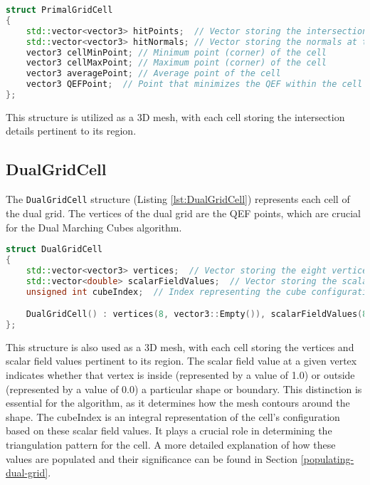 \vspace{2mm}
\begin{lstlisting}[language=C++, caption=PrimalGridCell structure, label=lst:PrimalGridCell]
struct PrimalGridCell 
{
    std::vector<vector3> hitPoints;  // Vector storing the intersection points within the cell
    std::vector<vector3> hitNormals; // Vector storing the normals at the intersection points within the cell
    vector3 cellMinPoint; // Minimum point (corner) of the cell
    vector3 cellMaxPoint; // Maximum point (corner) of the cell
    vector3 averagePoint; // Average point of the cell
    vector3 QEFPoint;  // Point that minimizes the QEF within the cell
};
\end{lstlisting}


This structure is utilized as a 3D mesh, with each cell storing the intersection details pertinent to its region.

\subsection{DualGridCell} \label{DualGridCell}

The \texttt{DualGridCell} structure (Listing \ref{lst:DualGridCell}) represents each cell of the dual grid. The vertices of the dual grid are the QEF points, which are crucial for the Dual Marching Cubes algorithm.

\vspace{2mm}
\begin{lstlisting}[language=C++, caption=DualGridCell structure, label=lst:DualGridCell]
struct DualGridCell
{
    std::vector<vector3> vertices;  // Vector storing the eight vertices of the dual grid cell
    std::vector<double> scalarFieldValues;  // Vector storing the scalar field values at each vertex
    unsigned int cubeIndex;  // Index representing the cube configuration based on the scalar field

    DualGridCell() : vertices(8, vector3::Empty()), scalarFieldValues(8, 0.0), cubeIndex(0) {}  // Constructor initializing the vectors and cube index
};
\end{lstlisting}

This structure is also used as a 3D mesh, with each cell storing the vertices and scalar field values pertinent to its region. The scalar field value at a given vertex indicates whether that vertex is inside (represented by a value of 1.0) or outside (represented by a value of 0.0) a particular shape or boundary. This distinction is essential for the algorithm, as it determines how the mesh contours around the shape. The cubeIndex is an integral representation of the cell's configuration based on these scalar field values. It plays a crucial role in determining the triangulation pattern for the cell. A more detailed explanation of how these values are populated and their significance can be found in Section \ref{populating-dual-grid}.


